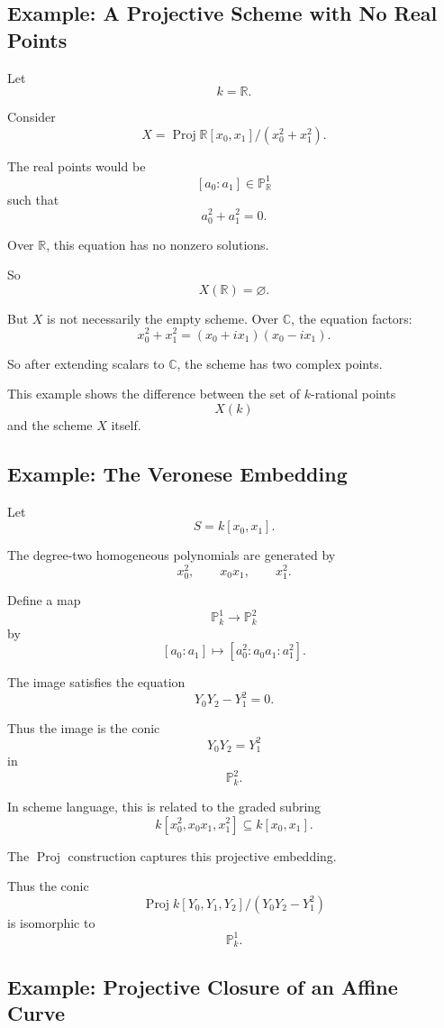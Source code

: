 \documentclass[12pt,a4paper]{article}
\DeclareMathOperator{\Proj}{Proj}
\newcommand{\PP}{\mathbb P}
\theoremstyle{notespace}
\begin{document}
\subsection{Example: A Projective Scheme with No Real Points}

Let
\[
k=\mathbb R.
\]

Consider
\[
X=\Proj \mathbb R[x_0,x_1]/(x_0^2+x_1^2).
\]

The real points would be
\[
[a_0:a_1]\in \PP_{\mathbb R}^1
\]
such that
\[
a_0^2+a_1^2=0.
\]

Over \(\mathbb R\), this equation has no nonzero solutions.

So
\[
X(\mathbb R)=\varnothing.
\]

But \(X\) is not necessarily the empty scheme. Over \(\mathbb C\), the equation factors:
\[
x_0^2+x_1^2
=
(x_0+ix_1)(x_0-ix_1).
\]

So after extending scalars to \(\mathbb C\), the scheme has two complex points.

This example shows the difference between the set of \(k\)-rational points
\[
X(k)
\]
and the scheme \(X\) itself.

\subsection{Example: The Veronese Embedding}

Let
\[
S=k[x_0,x_1].
\]

The degree-two homogeneous polynomials are generated by
\[
x_0^2,\qquad x_0x_1,\qquad x_1^2.
\]

Define a map
\[
\PP_k^1\longrightarrow \PP_k^2
\]
by
\[
[a_0:a_1]
\longmapsto
[a_0^2:a_0a_1:a_1^2].
\]

The image satisfies the equation
\[
Y_0Y_2-Y_1^2=0.
\]

Thus the image is the conic
\[
Y_0Y_2=Y_1^2
\]
in
\[
\PP_k^2.
\]

In scheme language, this is related to the graded subring
\[
k[x_0^2,x_0x_1,x_1^2]\subseteq k[x_0,x_1].
\]

The \(\Proj\) construction captures this projective embedding.

Thus the conic
\[
\Proj k[Y_0,Y_1,Y_2]/(Y_0Y_2-Y_1^2)
\]
is isomorphic to
\[
\PP_k^1.
\]

\subsection{Example: Projective Closure of an Affine Curve}
\end{document}

